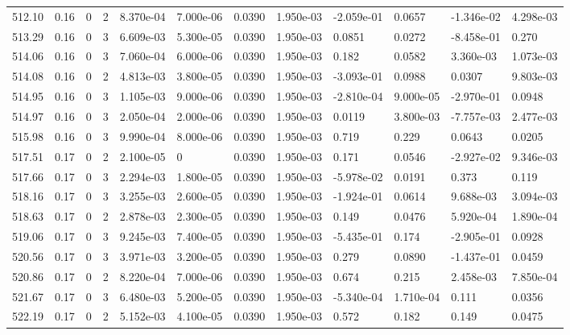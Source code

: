 \documentclass[preview]{standalone}
\begin{document}
{{{{{{{{{{{{{{{{\begin{tabular}{L{1.2cm}C{1.2cm} C{0.3cm}C{0.5cm} C{1.4cm}C{1.4cm} C{1.4cm}C{1.4cm} C{1.6cm}C{1.6cm} C{1.6cm}C{1.6cm}}
  512.10  &  0.16  & 0     &  2 &  8.370e-04  & 7.000e-06  &  0.0390&   1.950e-03& -2.059e-01 & 0.0657   &  -1.346e-02 & 4.298e-03  \\ 
  513.29  &  0.16  & 0     &  3 &  6.609e-03  & 5.300e-05  &  0.0390&   1.950e-03& 0.0851 & 0.0272   &  -8.458e-01 & 0.270  \\ 
  514.06  &  0.16  & 0     &  3 &  7.060e-04  & 6.000e-06  &  0.0390&   1.950e-03& 0.182 & 0.0582   &  3.360e-03 & 1.073e-03  \\ 
  514.08  &  0.16  & 0     &  2 &  4.813e-03  & 3.800e-05  &  0.0390&   1.950e-03& -3.093e-01 & 0.0988   &  0.0307 & 9.803e-03  \\ 
  514.95  &  0.16  & 0     &  3 &  1.105e-03  & 9.000e-06  &  0.0390&   1.950e-03& -2.810e-04 & 9.000e-05   &  -2.970e-01 & 0.0948  \\ 
  514.97  &  0.16  & 0     &  3 &  2.050e-04  & 2.000e-06  &  0.0390&   1.950e-03& 0.0119 & 3.800e-03   &  -7.757e-03 & 2.477e-03  \\ 
  515.98  &  0.16  & 0     &  3 &  9.990e-04  & 8.000e-06  &  0.0390&   1.950e-03& 0.719 & 0.229   &  0.0643 & 0.0205  \\ 
  517.51  &  0.17  & 0     &  2 &  2.100e-05  & 0  &  0.0390&   1.950e-03& 0.171 & 0.0546   &  -2.927e-02 & 9.346e-03  \\ 
  517.66  &  0.17  & 0     &  3 &  2.294e-03  & 1.800e-05  &  0.0390&   1.950e-03& -5.978e-02 & 0.0191   &  0.373 & 0.119  \\ 
  518.16  &  0.17  & 0     &  3 &  3.255e-03  & 2.600e-05  &  0.0390&   1.950e-03& -1.924e-01 & 0.0614   &  9.688e-03 & 3.094e-03  \\ 
  518.63  &  0.17  & 0     &  2 &  2.878e-03  & 2.300e-05  &  0.0390&   1.950e-03& 0.149 & 0.0476   &  5.920e-04 & 1.890e-04  \\ 
  519.06  &  0.17  & 0     &  3 &  9.245e-03  & 7.400e-05  &  0.0390&   1.950e-03& -5.435e-01 & 0.174   &  -2.905e-01 & 0.0928  \\ 
  520.56  &  0.17  & 0     &  3 &  3.971e-03  & 3.200e-05  &  0.0390&   1.950e-03& 0.279 & 0.0890   &  -1.437e-01 & 0.0459  \\ 
  520.86  &  0.17  & 0     &  2 &  8.220e-04  & 7.000e-06  &  0.0390&   1.950e-03& 0.674 & 0.215   &  2.458e-03 & 7.850e-04  \\ 
  521.67  &  0.17  & 0     &  3 &  6.480e-03  & 5.200e-05  &  0.0390&   1.950e-03& -5.340e-04 & 1.710e-04   &  0.111 & 0.0356  \\ 
  522.19  &  0.17  & 0     &  2 &  5.152e-03  & 4.100e-05  &  0.0390&   1.950e-03& 0.572 & 0.182   &  0.149 & 0.0475  \\ 

\end{tabular}}}}}}}}}}}}}}}}}
\end{document}
